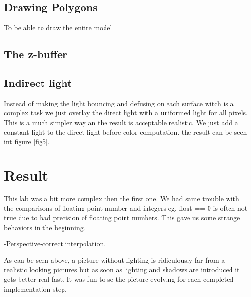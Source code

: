 \documentclass[a4paper,11pt]{article}
\begin{document}
\subsection{Drawing Polygons}
To be able to draw the entire model 


\subsection{The z-buffer}
\subsection{Indirect light}
Instead of making the light bouncing and defusing on each surface witch is a complex task we just overlay the direct light with a uniformed light for all pixels. This is a much simpler way an the result is acceptable realistic. We just add a constant light to the direct light before color computation. the result can be seen int figure \ref{fig5}. 

\section{Result}
This lab was a bit more complex then the first one. We had same trouble with the comparisons of floating point number and integers eg. float == 0 is often not true due to bad precision of floating point numbers. This gave us some strange behaviors in the beginning.



-Perspective-correct interpolation. 


As can be seen above, a picture without lighting is ridiculously far from a realistic looking pictures but as soon as lighting and shadows are introduced it gets better real fast. It was fun to se the picture evolving for each completed implementation step. 
\end{document}
